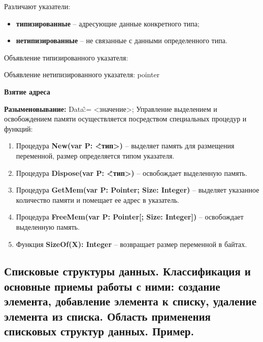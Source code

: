 Различают указатели: 

\begin{itemize}
\item {\bf{типизированные}} – адресующие данные конкретного типа;
\item {\bf{нетипизированные}} – не связанные с данными определенного типа.
\end{itemize}

Объявление типизированного указателя:


Объявление нетипизированного указателя: pointer

{\bf Взятие адреса}
 

{\bf Разыменовывание: }
Data\^ := <значение>;
\newpage
Управление выделением и освобождением памяти осуществляется посредством специальных процедур и функций:

\begin{enumerate}
\item Процедура {\bf New(var P: \^<тип>)} – выделяет память для размещения переменной, размер определяется типом указателя.
\item Процедура {\bf Dispose(var P: \^<тип>)} – освобождает выделенную память.
\item Процедура {\bf GetMem(var P: Pointer; Size: Integer)} – выделяет указанное количество памяти и помещает ее адрес в указатель.
\item Процедура {\bf FreeMem(var P: Pointer[; Size: Integer])} – освобождает выделенную память.
\item Функция {\bf SizeOf(X): Integer} – возвращает размер переменной в байтах.
\end{enumerate}







\newpage\subsection{Списковые  структуры  данных.  Классификация  и  основные  приемы  работы  с  ними:  создание элемента, добавление элемента к списку, удаление элемента из списка. Область применения списковых структур данных. Пример. }

\begin{myquote}
            
\end{myquote}

